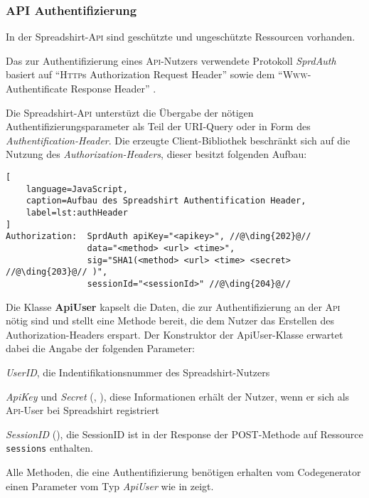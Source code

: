 \subsubsection{API Authentifizierung}
\label{sec:api_auth}

In der Spreadshirt-\textsc{Api} sind geschützte und ungeschützte Ressourcen vorhanden. 

Das zur Authentifizierung eines \textsc{Api}-Nutzers verwendete Protokoll \emph{SprdAuth} basiert auf \enquote{\textsc{Http}s Authorization Request Header} sowie dem \enquote{\textsc{Www}-Authentificate Response Header} \cite{apiSecurity}.

Die Spreadshirt-\textsc{Api} unterstüzt die Übergabe der nötigen Authentifizierungsparameter als Teil der \gls{URI}-Query oder in Form des \emph{Authentification-Header}. Die erzeugte Client-Bibliothek beschränkt sich auf die Nutzung des \emph{Authorization-Headers}, dieser besitzt folgenden Aufbau:

\begin{lstlisting}[
    language=JavaScript,
    caption=Aufbau des Spreadshirt Authentification Header,
    label=lst:authHeader
]
Authorization:  SprdAuth apiKey="<apikey>", //@\ding{202}@// 
                data="<method> <url> <time>", 
                sig="SHA1(<method> <url> <time> <secret> //@\ding{203}@// )", 
                sessionId="<sessionId>" //@\ding{204}@//
\end{lstlisting}

Die Klasse \textbf{ApiUser} kapselt die Daten, die zur Authentifizierung an der \textsc{Api} nötig sind und stellt eine Methode bereit, die dem Nutzer das Erstellen des Authorization-Headers erspart. Der Konstruktor der ApiUser-Klasse erwartet dabei die Angabe der folgenden Parameter:

\begin{compactitem}
    \item \emph{UserID}, die Indentifikationsnummer des Spreadshirt-Nutzers
    \item \emph{ApiKey} und \emph{Secret} (, ), diese Informationen erhält der Nutzer, wenn er sich als \textsc{Api}-User bei Spreadshirt registriert
    \item \emph{SessionID} (), die SessionID ist in der Response der POST-Methode auf Ressource \texttt{sessions} enthalten.
\end{compactitem}

Alle Methoden, die eine Authentifizierung benötigen erhalten vom Codegenerator einen Parameter vom Typ \emph{ApiUser} wie  in  zeigt.